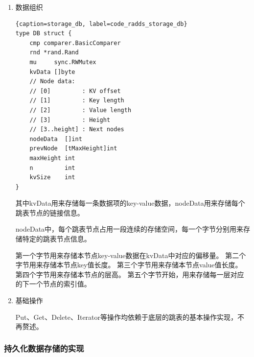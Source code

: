 \begin{enumerate}
			\item 数据组织
			
			\begin{lstlisting}{caption=storage_db, label=code_radds_storage_db}
type DB struct {
	cmp comparer.BasicComparer
	rnd *rand.Rand
	mu     sync.RWMutex
	kvData []byte
	// Node data:
	// [0]         : KV offset
	// [1]         : Key length
	// [2]         : Value length
	// [3]         : Height
	// [3..height] : Next nodes
	nodeData  []int
	prevNode  [tMaxHeight]int
	maxHeight int
	n         int
	kvSize    int
}
		\end{lstlisting}
				
			
			其中kvData用来存储每一条数据项的key-value数据，nodeData用来存储每个跳表节点的链接信息。

			nodeData中，每个跳表节点占用一段连续的存储空间，每一个字节分别用来存储特定的跳表节点信息。

			第一个字节用来存储本节点key-value数据在kvData中对应的偏移量。
			第二个字节用来存储本节点key值长度。
			第三个字节用来存储本节点value值长度。
			第四个字节用来存储本节点的层高。
			第五个字节开始，用来存储每一层对应的下一个节点的索引值。

		\item 基础操作
		
		Put、Get、Delete、Iterator等操作均依赖于底层的跳表的基本操作实现，不再赘述。
		\end{enumerate}

		\subsubsection{持久化数据存储的实现}

